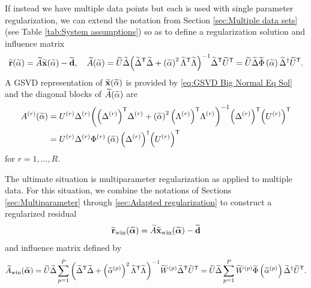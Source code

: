 \documentclass[12pt]{article}
\begin{document}
If instead we have multiple data points but each is used with single parameter regularization, we can extend the notation from Section \ref{sec:Multiple data sets} (see Table \ref{tab:System assumptions}) so as to define a regularization solution and influence matrix
\begin{equation}
\label{eq:Big regularized residual}
\widetilde{\mathbf{r}}(\widetilde{\alpha}) = \widetilde{A}\widetilde{\mathbf{x}}(\widetilde{\alpha}) - \widetilde{\mathbf{d}}, \quad \widetilde{A}(\widetilde{\alpha}) = \widetilde{U}\widetilde{\Delta}{\left({\widetilde{\Delta}}^\mathsf{T}\widetilde{\Delta} + \left(\widetilde{\alpha}\right)^2 {\widetilde{\Lambda}}^\mathsf{T}\widetilde{\Lambda}\right)}^{-1}{\widetilde{\Delta}}^\mathsf{T}{\widetilde{U}}^\mathsf{T} = \widetilde{U}\widetilde{\Delta}\widetilde{\Phi}\left(\widetilde{\alpha}\right){\widetilde{\Delta}}^\dagger{\widetilde{U}}^\mathsf{T}.
\end{equation}
A GSVD representation of $\widetilde{\mathbf{x}}(\widetilde{\alpha})$ is provided by \eqref{eq:GSVD Big Normal Eq Sol} and the diagonal blocks of $\widetilde{A}(\widetilde{\alpha})$ are
\begin{align}
    A^{(r)}(\widetilde{\alpha}) &= U^{(r)}\Delta^{(r)}{\left({\left(\Delta^{(r)}\right)}^\mathsf{T}\Delta^{(r)} + \left(\widetilde{\alpha}\right)^2 {\left(\Lambda^{(r)}\right)}^\mathsf{T}\Lambda^{(r)}\right)}^{-1}{\left(\Delta^{(r)}\right)}^\mathsf{T}{\left(U^{(r)}\right)}^\mathsf{T} \nonumber \\ 
    &= U^{(r)}\Delta^{(r)}\Phi^{(r)}\left(\widetilde{\alpha}\right){\left(\Delta^{(r)}\right)}^\dagger{\left(U^{(r)}\right)}^\mathsf{T} \label{eq:Diagonal blocks}
\end{align}
for $r = 1,\ldots,R$. \par
The ultimate situation is multiparameter regularization as applied to multiple data. For this situation, we combine the notations of Sections \ref{sec:Multiparameter} through \ref{sec:Adapted regularization} to construct a regularized residual
\begin{equation}
\label{eq:Windowed Big regularized residual}
\widetilde{\mathbf{r}}_{\text{win}}(\widetilde{\bm{\alpha}}) = \widetilde{A}\widetilde{\mathbf{x}}_{\text{win}}(\widetilde{\bm{\alpha}}) - \widetilde{\mathbf{d}}
\end{equation}
and influence matrix defined by
\begin{equation}
    \label{eq:Windowed Big Influence Matrix}
    \widetilde{A}_{\text{win}}(\widetilde{\bm{\alpha}}) = \widetilde{U}\widetilde{\Delta}\sum_{p=1}^{P}{\left({\widetilde{\Delta}}^\mathsf{T}\widetilde{\Delta} + \left(\widetilde{\alpha}^{(p)}\right)^2 {\widetilde{\Lambda}}^\mathsf{T}\widetilde{\Lambda}\right)}^{-1}\widetilde{W}^{(p)}{\widetilde{\Delta}}^\mathsf{T}{\widetilde{U}}^\mathsf{T} = \widetilde{U}\widetilde{\Delta}\sum_{p=1}^{P}\widetilde{W}^{(p)}\widetilde{\Phi}\left(\widetilde{\alpha}^{(p)}\right){\widetilde{\Delta}}^\dagger{\widetilde{U}}^\mathsf{T}.
\end{equation}
\end{document}
